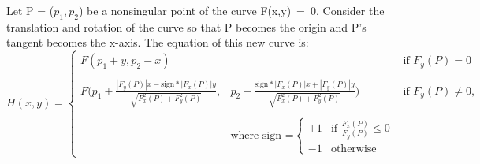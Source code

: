 \begin{lemma}
\label{newcurveeqn}
Let P = ($p_{1},p_{2}$) be a nonsingular point of the curve
\mbox{F(x,y) = 0}.
Consider the translation and rotation of the curve so that P becomes the
origin and P's tangent becomes the x-axis.
The equation of this new curve is:
%
\[ H(x,y) = \left\{ \begin{array}{lll}
F(p_{1}+y,p_{2}-x)  & & \mbox{if $F_{y}(P) = 0$} \\ \\
F(p_{1}+\frac{|F_{y}(P)|x-\mbox{sign}*|F_{x}(P)|y}{\sqrt{F_{x}^{2}(P)+F_{y}^{2}(P)}} , &
p_{2} + \frac{\mbox{sign}*|F_{x}(P)|x + |F_{y}(P)|y}{\sqrt{F_{x}^{2}(P)+F_{y}^{2}(P)}}) & \mbox{if $F_{y}(P) \neq 0$,} \\ \\
 & \mbox{where sign =} \left\{ \begin{array}{ll}
			+1 & \mbox{if } \frac{F_{x}(P)}{F_{y}(P)} \leq 0 \\
			-1 & \mbox{otherwise}
			\end{array}
			\right.
	\end{array}
\right. \]
%
\end{lemma}
%
